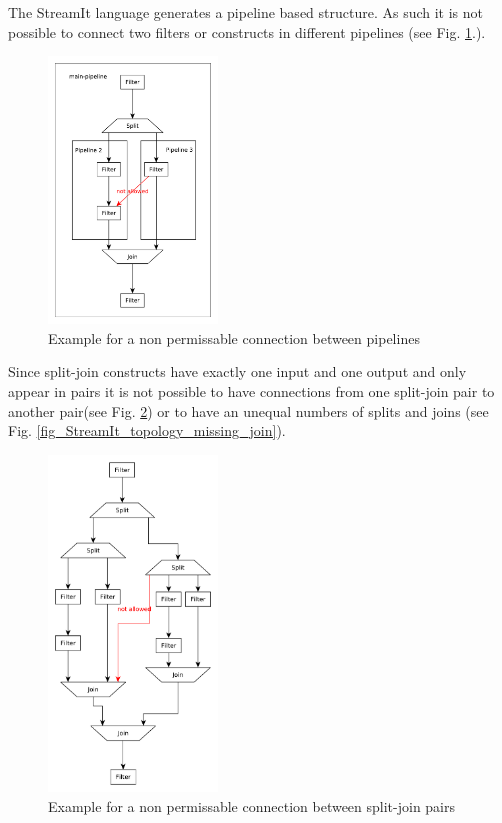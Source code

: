 \documentclass[journal]{IEEEtran}
\begin{document}
\noindent The StreamIt language generates a pipeline based structure. As such
it is not possible to connect two filters or constructs in different pipelines (see Fig. 
\ref{fig_StreamIt_topology}.).\\
\begin{figure}[h]
	\centering
	\includegraphics[width=0.4\textwidth]{StreamItTopology}
	\caption{Example for a non permissable connection between pipelines}
	\label{fig_StreamIt_topology}
\end{figure}
\noindent Since split-join constructs have exactly one input and one output and only appear in pairs it is not
 possible to have connections from one split-join pair to another pair(see Fig. 
 \ref{fig_StreamIt_topology_between_SJ}) or to have an unequal numbers of splits and joins (see Fig. 
 \ref{fig_StreamIt_topology_missing_join}).\\
\begin{figure}[h]
	\centering
	\includegraphics[width=0.4\textwidth]{StreamItTopologyBetweenSJ}
	\caption{Example for a non permissable connection between split-join pairs}
	\label{fig_StreamIt_topology_between_SJ}
\end{figure}
\end{document}
